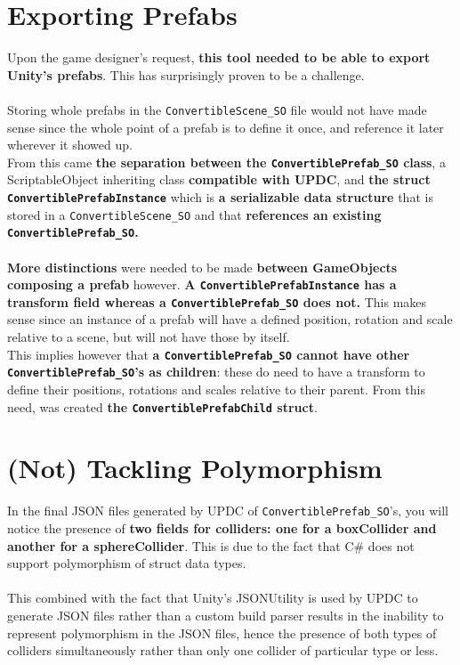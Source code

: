 \documentclass[12pt,a4paper]{article}
\begin{document}
\section{Exporting Prefabs}
Upon the game designer's request, \textbf{this tool needed to be able to export Unity's prefabs}. This has surprisingly proven to be a challenge.\\\\
Storing whole prefabs in the \texttt{ConvertibleScene\_SO} file would not have made sense since the whole point of a prefab is to define it once, and reference it later wherever it showed up.\\ From this came \textbf{the separation between the \texttt{ConvertiblePrefab\_SO} class}, a ScriptableObject inheriting class \textbf{compatible with UPDC}, and \textbf{the struct \texttt{ConvertiblePrefabInstance}} which is \textbf{a serializable data structure} that is stored in a \texttt{ConvertibleScene\_SO} and that \textbf{references an existing \texttt{ConvertiblePrefab\_SO}.}\\\\
\textbf{More distinctions} were needed to be made \textbf{between GameObjects composing a prefab} however. \textbf{A \texttt{ConvertiblePrefabInstance} has a transform field whereas a \texttt{ConvertiblePrefab\_SO} does not.} This makes sense since an instance of a prefab will have a defined position, rotation and scale relative to a scene, but will not have those by itself.\\
This implies however that \textbf{a \texttt{ConvertiblePrefab\_SO} cannot have other \texttt{ConvertiblePrefab\_SO}'s as children}: these do need to have a transform to define their positions, rotations and scales relative to their parent. From this need, was created \textbf{the \texttt{ConvertiblePrefabChild} struct}.

\section{(Not) Tackling Polymorphism}
In the final JSON files generated by UPDC of \texttt{ConvertiblePrefab\_SO}'s, you will notice the presence of \textbf{two fields for colliders: one for a boxCollider and another for a sphereCollider}. This is due to the fact that C\# does not support polymorphism of struct data types.\\\\
This combined with the fact that Unity's JSONUtility is used by UPDC to generate JSON files rather than a custom build parser results in the inability to represent polymorphism in the JSON files, hence the presence of both types of colliders simultaneously rather than only one collider of particular type or less.
\end{document}
